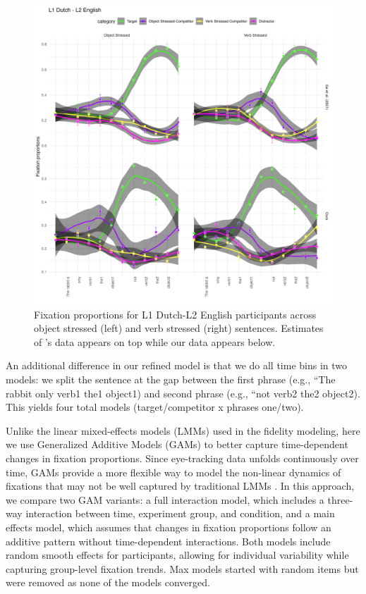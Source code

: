 \begin{figure}[H]  %
    \centering
    \includegraphics[width=\textwidth,height=\textheight,keepaspectratio]{viz/dutch_fix2.png}
    \caption{Fixation proportions for L1 Dutch-L2 English participants across object stressed (left) and verb stressed (right) sentences. Estimates of \cite{ge2021a}'s data appears on top while our data appears below.}
    \label{fig:dutch_fix2}
\end{figure}

An additional difference in our refined model is that we do all time bins in two models: we split the sentence at the gap between the first phrase (e.g., “The rabbit only verb1 the1 object1) and second phrase (e.g., “not verb2 the2 object2). This yields four total models (target/competitor x phrases one/two). 

Unlike the linear mixed-effects models (LMMs) used in the fidelity modeling, here we use Generalized Additive Models (GAMs) to better capture time-dependent changes in fixation proportions. Since eye-tracking data unfolds continuously over time, GAMs provide a more flexible way to model the non-linear dynamics of fixations that may not be well captured by traditional LMMs \parencite{Wood2017}. In this approach, we compare two GAM variants: a full interaction model, which includes a three-way interaction between time, experiment group, and condition, and a main effects model, which assumes that changes in fixation proportions follow an additive pattern without time-dependent interactions. Both models include random smooth effects for participants, allowing for individual variability while capturing group-level fixation trends. Max models started with random items but were removed as none of the models converged.

